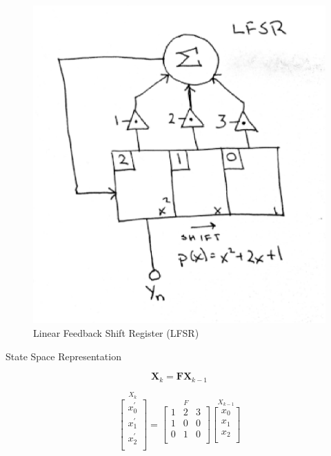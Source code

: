 \begin{figure}[H]
\begin{center}
\includegraphics{./figures/lfsr-2.eps}
\end{center}
\caption{Linear Feedback Shift Register (LFSR)}
\label{fig:lfsr}
\end{figure}

State Space Representation
\newline

\begin{equation}
\mathbf{X}_k = \mathbf{F}\mathbf{X}_{k-1}
\label{eq:ss_rep}
\end{equation}

\begin{equation}
\stackrel{\mbox{$X_k$}}{
\left[ \begin{array}{c}
x^{'}_{0} \\
x^{'}_{1} \\
x^{'}_{2} \\
\end{array} \right]
}
= 
\stackrel{\mbox{$F$}}{
\left[ \begin{array}{ccc}
1 & 2 & 3 \\
1 & 0 & 0 \\
0 & 1 & 0 \\
\end{array} \right]
}
\stackrel{\mbox{$X_{k-1}$}}{
\left[ \begin{array}{c}
x_{0} \\
x_{1} \\
x_{2} \\
\end{array} \right]
}
\label{eq:ss_rep_2}
\end{equation}

